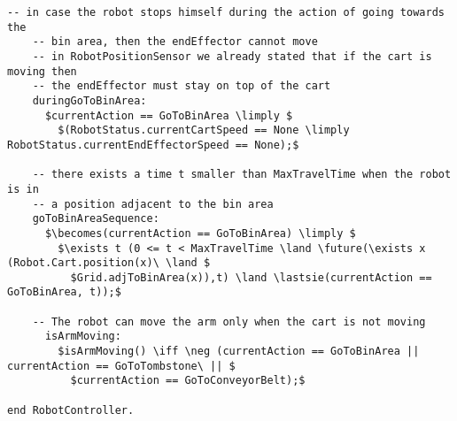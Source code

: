 \begin{lstlisting}[fontadjust, mathescape, frame=single]
    -- in case the robot stops himself during the action of going towards the 
    -- bin area, then the endEffector cannot move
    -- in RobotPositionSensor we already stated that if the cart is moving then 
    -- the endEffector must stay on top of the cart
    duringGoToBinArea:
      $currentAction == GoToBinArea \limply $
        $(RobotStatus.currentCartSpeed == None \limply RobotStatus.currentEndEffectorSpeed == None);$

    -- there exists a time t smaller than MaxTravelTime when the robot is in 
    -- a position adjacent to the bin area
    goToBinAreaSequence:
      $\becomes(currentAction == GoToBinArea) \limply $
        $\exists t (0 <= t < MaxTravelTime \land \future(\exists x (Robot.Cart.position(x)\ \land $
          $Grid.adjToBinArea(x)),t) \land \lastsie(currentAction == GoToBinArea, t));$
                      
    -- The robot can move the arm only when the cart is not moving
      isArmMoving: 
        $isArmMoving() \iff \neg (currentAction == GoToBinArea || currentAction == GoToTombstone\ || $
          $currentAction == GoToConveyorBelt);$
         
end RobotController.
\end{lstlisting}